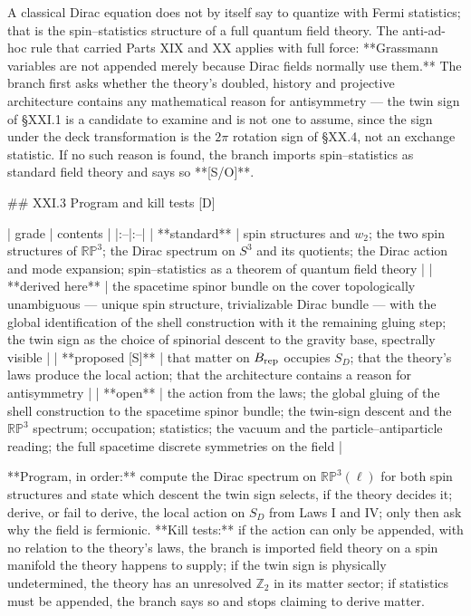 A classical Dirac equation does not by itself say to quantize with Fermi statistics; that is the spin–statistics structure of a full quantum field theory. The anti-ad-hoc rule that carried Parts XIX and XX applies with full force: **Grassmann variables are not appended merely because Dirac fields normally use them.** The branch first asks whether the theory's doubled, history and projective architecture contains any mathematical reason for antisymmetry — the twin sign of §XXI.1 is a candidate to examine and is not one to assume, since the sign under the deck transformation is the $2\pi$ rotation sign of §XX.4, not an exchange statistic. If no such reason is found, the branch imports spin–statistics as standard field theory and says so **[S/O]**.

## XXI.3 Program and kill tests [D]

| grade | contents |
|:--|:--|
| **standard** | spin structures and $w_2$; the two spin structures of $\mathbb{RP}^3$; the Dirac spectrum on $S^3$ and its quotients; the Dirac action and mode expansion; spin–statistics as a theorem of quantum field theory |
| **derived here** | the spacetime spinor bundle on the cover topologically unambiguous — unique spin structure, trivializable Dirac bundle — with the global identification of the shell construction with it the remaining gluing step; the twin sign as the choice of spinorial descent to the gravity base, spectrally visible |
| **proposed [S]** | that matter on $B_{\rm rep}$ occupies $S_D$; that the theory's laws produce the local action; that the architecture contains a reason for antisymmetry |
| **open** | the action from the laws; the global gluing of the shell construction to the spacetime spinor bundle; the twin-sign descent and the $\mathbb{RP}^3$ spectrum; occupation; statistics; the vacuum and the particle–antiparticle reading; the full spacetime discrete symmetries on the field |

**Program, in order:** compute the Dirac spectrum on $\mathbb{RP}^3(\ell)$ for both spin structures and state which descent the twin sign selects, if the theory decides it; derive, or fail to derive, the local action on $S_D$ from Laws I and IV; only then ask why the field is fermionic. **Kill tests:** if the action can only be appended, with no relation to the theory's laws, the branch is imported field theory on a spin manifold the theory happens to supply; if the twin sign is physically undetermined, the theory has an unresolved $\mathbb Z_2$ in its matter sector; if statistics must be appended, the branch says so and stops claiming to derive matter.

